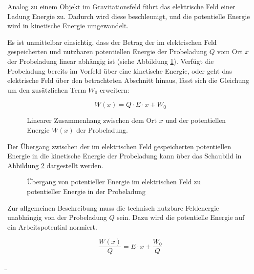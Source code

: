 \begin{frame}
{Analog zu einem Objekt im Gravitationsfeld führt das elektrische Feld einer Ladung Energie zu.
Dadurch wird diese beschleunigt, und die potentielle Energie wird in kinetische Energie
 umgewandelt.


 Es ist unmittelbar einsichtig, dass der Betrag der im elektrischen Feld
gespeicherten und nutzbaren potentiellen Energie der Probeladung
$Q$ vom Ort $x$ der Probeladung linear abhängig ist (siehe Abbildung \ref{fig:zusammenhangEA}). Verfügt die Probeladung
 bereits im Vorfeld über eine kinetische Energie, oder geht das elektrische Feld über den betrachteten Abschnitt hinaus,
 lässt sich die Gleichung um den zusätzlichen Term $W_0$ erweitern:


 \begin{equation}
	W(x) = Q \cdot E \cdot x + W_0
 \end{equation}



 \begin{figure}[h!]
	\centering
	
	\caption{Linearer Zusammenhang zwischen dem Ort $x$ und der potentiellen Energie $W(x)$ der Probeladung.}
	\label{fig:zusammenhangEA}
\end{figure}


 

Der Übergang zwischen der im elektrischen Feld gespeicherten potentiellen Energie in die kinetische Energie
der Probeladung kann über das Schaubild in Abbildung \ref{fig:ubergang} dargestellt werden.

\begin{figure}[h!]
	\centering
	
	\caption{Übergang von potentieller Energie im elektrischen Feld zu potentieller Energie in der Probeladung}
	\label{fig:ubergang}
\end{figure}




 Zur allgemeinen Beschreibung muss die technisch nutzbare Feldenergie unabhängig von der Probeladung $Q$ sein.
Dazu wird die potentielle Energie auf ein Arbeitspotential normiert. 

 \begin{equation*}
	\frac{W(x)}{Q} =  E \cdot x + \frac{W_0}{Q}
 \end{equation*}

 

	}

	\b{
	\begin{columns}


\end{columns}}
\end{frame}
